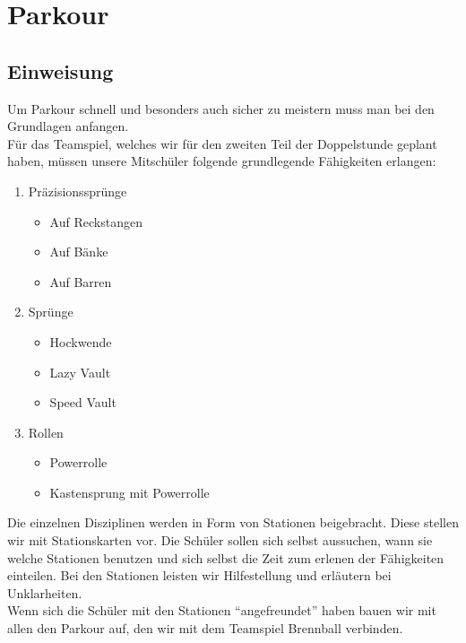 \documentclass[ngerman,12pt,titlepage]{scrartcl}
\begin{document}
\section{Parkour}
\subsection{Einweisung}
Um Parkour schnell und besonders auch sicher zu meistern muss man bei den Grundlagen anfangen. \\ Für das Teamspiel, welches wir für den zweiten Teil der Doppelstunde geplant haben, müssen unsere Mitschüler folgende grundlegende Fähigkeiten erlangen:
\newpage
\begin{enumerate}
	\item Präzisionssprünge
	\begin{itemize}
		\item Auf Reckstangen
		\item Auf Bänke
		\item Auf Barren
	\end{itemize}
	\item Sprünge
	\begin{itemize}
		\item Hockwende
		\item Lazy Vault
		\item Speed Vault
	\end{itemize}
\item Rollen
\begin{itemize}
\item Powerrolle
\item Kastensprung mit Powerrolle
\end{itemize}
\end{enumerate}
Die einzelnen Disziplinen werden in Form von Stationen beigebracht. Diese stellen wir mit Stationskarten vor. Die Schüler sollen sich selbst aussuchen, wann sie welche Stationen benutzen und sich selbst die Zeit zum erlenen der Fähigkeiten einteilen. Bei den Stationen leisten wir Hilfestellung und erläutern bei Unklarheiten. \\
Wenn sich die Schüler mit den Stationen \enquote{angefreundet} haben bauen wir mit allen den Parkour auf, den wir mit dem Teamspiel Brennball verbinden.
\end{document}
